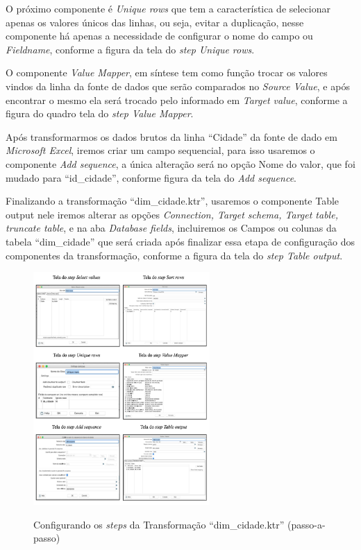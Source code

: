 O pr\'oximo componente \'{e} \textit{Unique rows} que tem a característica de selecionar apenas os valores únicos das linhas, ou seja, evitar a duplica\c{c}\~{a}o, nesse componente h\'{a} apenas a necessidade de configurar o nome do campo ou \textit{Fieldname}, conforme a figura da tela do \textit{step Unique rows}.

O componente \textit{Value Mapper}, em síntese tem como fun\c{c}\~{a}o trocar os valores vindos da linha da fonte de dados que ser\~{a}o comparados no \textit{Source Value}, e ap\'os encontrar o mesmo ela ser\'{a} trocado pelo informado em \textit{Target value}, conforme a figura do quadro tela do \textit{step Value Mapper}.

Ap\'os transformarmos os dados brutos da linha ``Cidade'' da fonte de dado em \textit{Microsoft Excel}, iremos criar um campo sequencial, para isso usaremos o componente \textit{Add sequence}, a única altera\c{c}\~{a}o ser\'{a} no op\c{c}\~{a}o Nome do valor, que foi mudado para ``id\_cidade'', conforme figura da tela do \textit{Add sequence}.

Finalizando a transforma\c{c}\~{a}o ``dim\_cidade.ktr'', usaremos o componente Table output nele iremos alterar as op\c{c}\~{o}es \textit{Connection, Target schema, Target table, truncate table}, e na aba \textit{Database fields}, incluiremos os Campos ou colunas da tabela ``dim\_cidade'' que ser\'{a} criada ap\'os finalizar essa etapa de configura\c{c}\~{a}o dos componentes da transforma\c{c}\~{a}o, conforme a figura da tela do \textit{step Table output}.

\begin{figure}[H]
	\vspace*{0,2cm}
    \centering
    \caption{Configurando os \textit{steps} da Transforma\c{c}\~{a}o ``dim\_cidade.ktr'' (passo-a-passo)}
    \includegraphics[width=0.6\textwidth]{./04-figuras/figura-step-dim-cidade}
    \label{fig:ilustfigstepdimcidade}
\end{figure}
\vspace*{-0,9cm}
{\raggedright {}} \\

